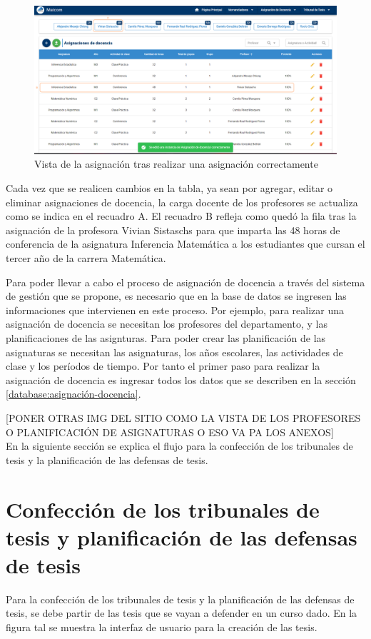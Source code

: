 \begin{figure}[H]
    \includegraphics[scale=0.3]{Graphics/Implementation/Docencia/AD-result.png}
    \caption{Vista de la asignación tras realizar una asignación correctamente}
    \label{img-ta-result}
\end{figure}

Cada vez que se realicen cambios en la tabla, ya sean por agregar, editar o eliminar 
asignaciones de docencia, la carga docente de los profesores se actualiza como se indica 
en el recuadro A. El recuadro B refleja como quedó la fila tras la asignación de la profesora 
Vivian Sistaschs para que imparta las 48 horas de conferencia de la asignatura Inferencia Matemática
a los estudiantes que cursan el tercer año de la carrera Matemática.


Para poder llevar a cabo el proceso de asignación de docencia a través del sistema de 
gestión que se propone, es necesario que en la base de datos se ingresen las informaciones 
que intervienen en este proceso. Por ejemplo, para realizar una asignación de docencia se necesitan 
los profesores del departamento, 
y las planificaciones de las asignturas. Para poder crear las planificación de las asignaturas 
se necesitan las asignaturas, los años escolares, las actividades de clase y los períodos de tiempo.
Por tanto el primer paso para realizar la asignación de docencia es ingresar todos los datos que 
se describen en la sección \ref{database:asignación-docencia}.


[PONER OTRAS IMG DEL SITIO COMO LA VISTA DE LOS PROFESORES O PLANIFICACIÓN DE ASIGNATURAS 
O ESO VA PA LOS ANEXOS]\\


En la siguiente sección se explica el flujo para la confección de los 
tribunales de tesis y la planificación de las defensas de tesis.

\section{Confección de los tribunales de tesis y planificación de las defensas de tesis}
Para la confección de los tribunales de tesis y la planificación de las defensas de tesis,
se debe partir de las tesis que se vayan a defender en un curso dado. En la 
figura tal se muestra la interfaz de usuario para la creación de las tesis.

